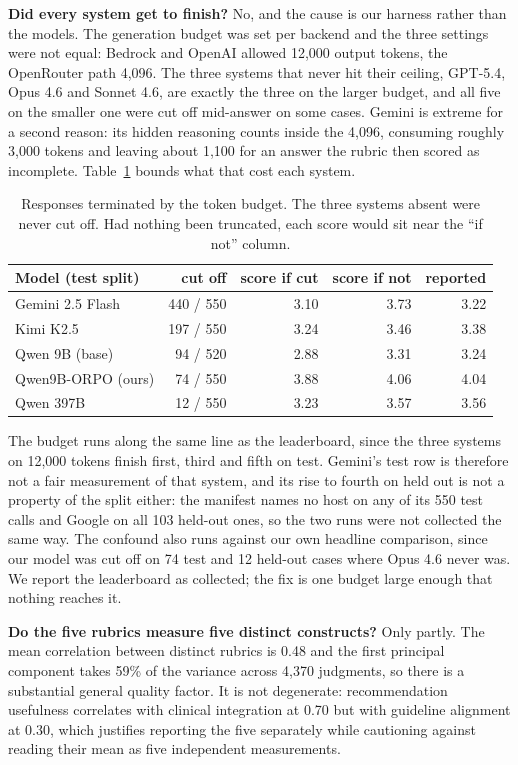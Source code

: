 \textbf{Did every system get to finish?} No, and the cause is our harness rather
than the models. The generation budget was set per backend and the three settings
were not equal: Bedrock and OpenAI allowed 12,000 output tokens, the OpenRouter
path 4,096. The three systems that never hit their ceiling, GPT-5.4,
Opus 4.6 and Sonnet 4.6, are exactly the three on the larger budget, and all five
on the smaller one were cut off mid-answer on some cases. Gemini is extreme for a
second reason: its hidden reasoning counts inside the 4,096, consuming roughly
3,000 tokens and leaving about 1,100 for an answer the rubric then scored as
incomplete. Table~\ref{tab:truncation} bounds what that cost each system.

\begin{table}[H]
\centering
\small
\begin{tabular}{lrrrr}
\toprule
\textbf{Model (test split)} & \textbf{cut off} & \textbf{score if cut} &
\textbf{score if not} & \textbf{reported} \\
\midrule
Gemini 2.5 Flash & 440 / 550 & 3.10 & 3.73 & 3.22 \\
Kimi K2.5        & 197 / 550 & 3.24 & 3.46 & 3.38 \\
Qwen 9B (base)   &  94 / 520 & 2.88 & 3.31 & 3.24 \\
Qwen9B-ORPO (ours) & 74 / 550 & 3.88 & 4.06 & 4.04 \\
Qwen 397B        &  12 / 550 & 3.23 & 3.57 & 3.56 \\
\bottomrule
\end{tabular}
\caption{Responses terminated by the token budget. The three systems absent were
never cut off. Had nothing been truncated, each score would sit near the ``if
not'' column.}
\label{tab:truncation}
\end{table}

The budget runs along the same line as the leaderboard, since the three systems
on 12,000 tokens finish first, third and fifth on test. Gemini's test row is
therefore not a fair measurement of that system, and its rise to fourth on held
out is not a property of the split either: the manifest names no host on any of
its 550 test calls and Google on all 103 held-out ones, so the two runs were not
collected the same way. The confound also runs against our own headline
comparison, since our model was cut off on 74 test and 12 held-out cases where
Opus 4.6 never was. We report the leaderboard as collected; the fix is one budget
large enough that nothing reaches it.

\textbf{Do the five rubrics measure five distinct constructs?} Only partly. The
mean correlation between distinct rubrics is 0.48 and the first principal
component takes 59\% of the variance across 4,370 judgments, so there is a
substantial general quality factor. It is not degenerate: recommendation
usefulness correlates with clinical integration at 0.70 but with guideline
alignment at 0.30, which justifies reporting the five separately while cautioning
against reading their mean as five independent measurements.

